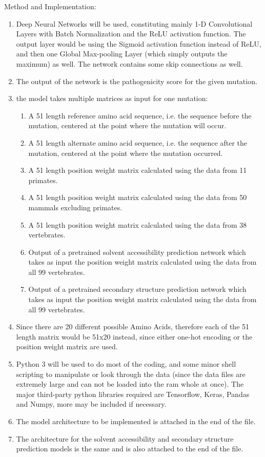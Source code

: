 \documentclass[twoside]{article}
\begin{document}
\begin{enumerate}
	 Method and Implementation:
	 \begin{enumerate}
	 \item Deep Neural Networks will be used, constituting mainly 1-D Convolutional Layers with Batch Normalization and the ReLU activation function. The output layer would be using the Sigmoid activation function instead of ReLU, and then one Global Max-pooling Layer (which simply outputs the maximum) as well. The network contains some skip connections as well.
	 \item The output of the network is the pathogenicity score for the given mutation.
	 \item the model takes multiple matrices as input for one mutation:
	 \begin{enumerate}
	 	\item A 51 length reference amino acid sequence, i.e. the sequence before the mutation, centered at the point where the mutation will occur.
	 	\item A 51 length alternate amino acid sequence, i.e. the sequence after the mutation, centered at the point where the mutation occurred.
	 	\item A 51 length position weight matrix calculated using the data from 11 primates.
	 	\item A 51 length position weight matrix calculated using the data from 50 mammals excluding primates.
	 	\item A 51 length position weight matrix calculated using the data from 38 vertebrates.
	 	\item Output of a pretrained solvent accessibility prediction network which takes as input the position weight matrix calculated using the data from all 99 vertebrates.
	 	\item Output of a pretrained secondary structure prediction network which takes as input the position weight matrix calculated using the data from all 99 vertebrates.
  	 \end{enumerate}
   	 \item Since there are 20 different possible Amino Acids, therefore each of the 51 length matrix would be 51x20 instead, since either one-hot encoding or the position weight matrix are used.
   	 \item Python 3 will be used to do most of the coding, and some minor shell scripting to manipulate or look through the data (since the data files are extremely large and can not be loaded into the ram whole at once). The major third-party python libraries required are Tensorflow, Keras, Pandas and Numpy, more may be included if necessary.
   	 \item The model architecture to be implemented is attached in the end of the file.
   	 \item The architecture for the solvent accessibility and secondary structure prediction models is the same and is also attached to the end of the file.
	 \end{enumerate}


\end{enumerate}
\end{document}
